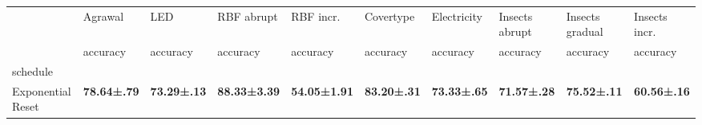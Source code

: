 \begin{tabular}{llllllllll}
\toprule
 & Agrawal & LED & RBF abrupt & RBF incr. & Covertype & Electricity & Insects abrupt & Insects gradual & Insects incr. \\
 & accuracy & accuracy & accuracy & accuracy & accuracy & accuracy & accuracy & accuracy & accuracy \\
schedule &  &  &  &  &  &  &  &  &  \\
\midrule
Exponential Reset & \bfseries 78.64±.79 & \bfseries 73.29±.13 & \bfseries 88.33±3.39 & \bfseries 54.05±1.91 & \bfseries 83.20±.31 & \bfseries 73.33±.65 & \bfseries 71.57±.28 & \bfseries 75.52±.11 & \bfseries 60.56±.16 \\
\bottomrule
\end{tabular}
